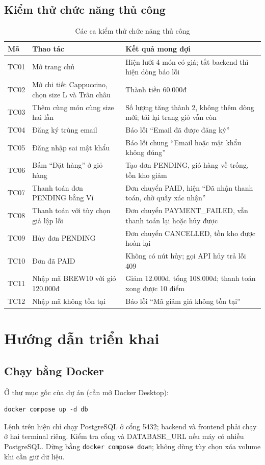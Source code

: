 \documentclass[a4paper]{article}
\begin{document}
\subsection{Kiểm thử chức năng thủ công}
\begin{table}[h!]
\centering
\footnotesize
\begin{tabularx}{\textwidth}{|l|X|X|}
\hline
\textbf{Mã} & \textbf{Thao tác} & \textbf{Kết quả mong đợi} \\ \hline
TC01 & Mở trang chủ & Hiện lưới 4 món có giá; tắt backend thì hiện dòng báo lỗi \\ \hline
TC02 & Mở chi tiết Cappuccino, chọn size L và Trân châu & Thành tiền 60.000đ \\ \hline
TC03 & Thêm cùng món cùng size hai lần & Số lượng tăng thành 2, không thêm dòng mới; tải lại trang giỏ vẫn còn \\ \hline
TC04 & Đăng ký trùng email & Báo lỗi ``Email đã được đăng ký'' \\ \hline
TC05 & Đăng nhập sai mật khẩu & Báo lỗi chung ``Email hoặc mật khẩu không đúng'' \\ \hline
TC06 & Bấm ``Đặt hàng'' ở giỏ hàng & Tạo đơn PENDING, giỏ hàng về trống, tồn kho giảm \\ \hline
TC07 & Thanh toán đơn PENDING bằng Ví & Đơn chuyển PAID, hiện ``Đã nhận thanh toán, chờ quầy xác nhận'' \\ \hline
TC08 & Thanh toán với tùy chọn giả lập lỗi & Đơn chuyển PAYMENT\_FAILED, vẫn thanh toán lại hoặc hủy được \\ \hline
TC09 & Hủy đơn PENDING & Đơn chuyển CANCELLED, tồn kho được hoàn lại \\ \hline
TC10 & Đơn đã PAID & Không có nút hủy; gọi API hủy trả lỗi 409 \\ \hline
TC11 & Nhập mã BREW10 với giỏ 120.000đ & Giảm 12.000đ, tổng 108.000đ; thanh toán xong được 10 điểm \\ \hline
TC12 & Nhập mã không tồn tại & Báo lỗi ``Mã giảm giá không tồn tại'' \\ \hline
\end{tabularx}
\caption{Các ca kiểm thử chức năng thủ công}
\end{table}



\newpage
\section{Hướng dẫn triển khai}
\subsection{Chạy bằng Docker}
Ở thư mục gốc của dự án (cần mở Docker Desktop):
\begin{lstlisting}[style=brew,language={}]
docker compose up -d db
\end{lstlisting}
Lệnh trên hiện chỉ chạy PostgreSQL ở cổng 5432; backend và frontend phải chạy ở hai terminal riêng. Kiểm tra cổng và DATABASE\_URL nếu máy có nhiều PostgreSQL. Dừng bằng \texttt{docker compose down}; không dùng tùy chọn xóa volume khi cần giữ dữ liệu.
\end{document}
